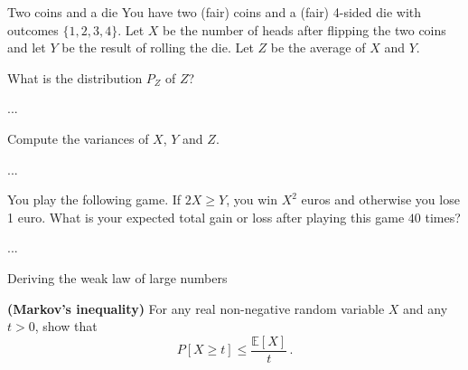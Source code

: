 \documentclass[a4paper,10pt]{article}
\begin{document}


\begin{nproblem}{7}{Two coins and a die}
You have two (fair) coins and a (fair) 4-sided die with outcomes $\{1,2,3,4\}$. Let $X$ be the number of heads after flipping the two coins and let $Y$ be the result of rolling the die. Let $Z$ be the average of $X$ and $Y$.
\end{nproblem}

\begin{subproblem}{2}
What is the distribution $P_Z$ of $Z$?
\end{subproblem}

\begin{solution}
...
\end{solution}


\begin{subproblem}{3}
Compute the variances of $X$, $Y$ and $Z$.
\end{subproblem}

\begin{solution}
...
\end{solution}

\begin{subproblem}{2}
You play the following game. If $2X \ge Y$, you win $X^2$ euros and otherwise you lose 1 euro. What is your expected total gain or loss after playing this game $40$ times?
\end{subproblem}

\begin{solution}
...
\end{solution}











\begin{nproblem}{9}{Deriving the weak law of large numbers}
\end{nproblem}
	\begin{subproblem}{2} \textbf{(Markov's inequality)} For any real non-negative random variable $X$ and any $t > 0$, show that
	\[
	P[X \geq t] \leq \frac{\mathbb{E}[X]}{t}\, .
	\]
\end{subproblem}
\end{document}
